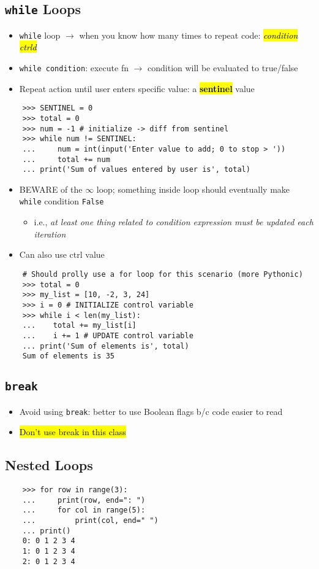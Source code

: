 \documentclass{article}
\begin{document}
\subsection{\texttt{while} Loops}
    \begin{itemize}
        \item \texttt{while} loop $\rightarrow$ when you know how many times to repeat code: \hl{\textit{condition ctrld}}
        \item \texttt{while condition}: execute fn $\rightarrow$ condition will be evaluated to true/false
        \item Repeat action until user enters specific value: a \hl{\textbf{sentinel}} value
    \end{itemize}
\vspace{-1em}
\begin{lstlisting}
    >>> SENTINEL = 0
    >>> total = 0
    >>> num = -1 # initialize -> diff from sentinel
    >>> while num != SENTINEL:
    ...     num = int(input('Enter value to add; 0 to stop > '))
    ...     total += num
    ... print('Sum of values entered by user is', total)
\end{lstlisting}
\vspace{-1em}
    \begin{itemize}
        \item BEWARE of the $\infty$ loop; something inside loop should eventually make \texttt{while} condition \texttt{False}
            \begin{itemize}
                \item i.e., \textit{at least one thing related to condition expression must be updated each iteration}
            \end{itemize}
        \item Can also use ctrl value
    \end{itemize}
\vspace{-1em}
\begin{lstlisting}
    # Should prolly use a for loop for this scenario (more Pythonic)
    >>> total = 0
    >>> my_list = [10, -2, 3, 24]
    >>> i = 0 # INITIALIZE control variable
    >>> while i < len(my_list):
    ...    total += my_list[i]
    ...    i += 1 # UPDATE control variable
    ... print('Sum of elements is', total)
    Sum of elements is 35
\end{lstlisting}

\subsection{\texttt{break}}
    \begin{itemize}
        \item Avoid using \texttt{break}: better to use Boolean flags b/c code easier to read
        \item \hl{Don't use break in this class}
    \end{itemize}

\subsection{Nested Loops}
\begin{lstlisting}
    >>> for row in range(3):
    ...     print(row, end=": ")
    ...     for col in range(5):
    ...         print(col, end=" ")
    ... print()
    0: 0 1 2 3 4
    1: 0 1 2 3 4
    2: 0 1 2 3 4 
\end{lstlisting}
\end{document}
